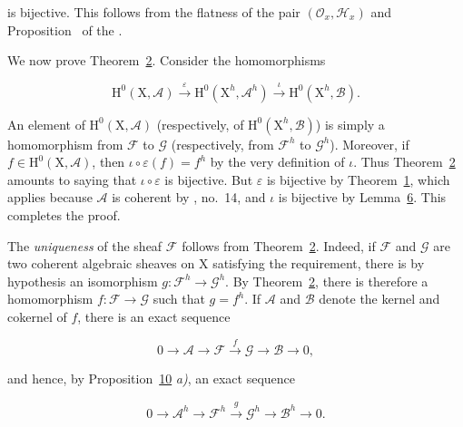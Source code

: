 is bijective. This follows from the flatness of the pair $(\mathcal{O}_x,\mathcal{H}_x)$ and Proposition~ of the .

We now prove Theorem~\hyperref[gaga:thm:2]{2}. Consider the homomorphisms

\begin{equation*}
\mathrm{H}^0(\mathrm{X},\mathcal{A})
\xrightarrow{\varepsilon}
\mathrm{H}^0(\mathrm{X}^h,\mathcal{A}^h)
\xrightarrow{\iota}
\mathrm{H}^0(\mathrm{X}^h,\mathcal{B}).
\end{equation*}

An element of $\mathrm{H}^0(\mathrm{X},\mathcal{A})$ (respectively, of $\mathrm{H}^0(\mathrm{X}^h,\mathcal{B})$) is simply a homomorphism from $\mathcal{F}$ to $\mathcal{G}$ (respectively, from $\mathcal{F}^h$ to $\mathcal{G}^h$). Moreover, if $f\in\mathrm{H}^0(\mathrm{X},\mathcal{A})$, then $\iota\circ\varepsilon(f)=f^h$ by the very definition of $\iota$. Thus Theorem~\hyperref[gaga:thm:2]{2} amounts to saying that $\iota\circ\varepsilon$ is bijective. But $\varepsilon$ is bijective by Theorem~\hyperref[gaga:thm:1]{1}, which applies because $\mathcal{A}$ is coherent by , no.~14, and $\iota$ is bijective by Lemma~\hyperref[gaga:lemma:6]{6}. This completes the proof.


The \emph{uniqueness} of the sheaf $\mathcal{F}$ follows from Theorem~\hyperref[gaga:thm:2]{2}. Indeed, if $\mathcal{F}$ and $\mathcal{G}$ are two coherent algebraic sheaves on $\mathrm{X}$ satisfying the requirement, there is by hypothesis an isomorphism $g:\mathcal{F}^h\to\mathcal{G}^h$. By Theorem~\hyperref[gaga:thm:2]{2}, there is therefore a homomorphism $f:\mathcal{F}\to\mathcal{G}$ such that $g=f^h$. If $\mathcal{A}$ and $\mathcal{B}$ denote the kernel and cokernel of $f$, there is an exact sequence

\begin{equation*}
0\longrightarrow\mathcal{A}\longrightarrow\mathcal{F}
\xrightarrow{f}\mathcal{G}\longrightarrow\mathcal{B}\longrightarrow0,
\end{equation*}

and hence, by Proposition~\hyperref[gaga:prop:10]{10} \emph{a)}, an exact sequence

\begin{equation*}
0\longrightarrow\mathcal{A}^h\longrightarrow\mathcal{F}^h
\xrightarrow{g}\mathcal{G}^h\longrightarrow\mathcal{B}^h\longrightarrow0.
\end{equation*}

